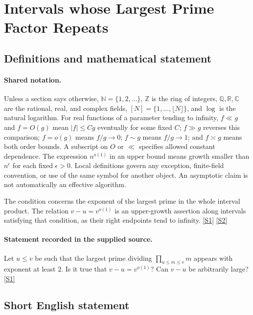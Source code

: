 \documentclass[11pt,a4paper]{article}
\newcommand{\N}{\mathbb{N}}
\newcommand{\Z}{\mathbb{Z}}
\newcommand{\Q}{\mathbb{Q}}
\newcommand{\R}{\mathbb{R}}
\newcommand{\C}{\mathbb{C}}
\newcommand{\sref}[2]{\hyperlink{source:#1:#2}{[S#2]}}
\begin{document}
\section{Intervals whose Largest Prime Factor Repeats}\label{statement}


\subsection{Definitions and mathematical statement}

\paragraph{Shared notation.}Unless a section says otherwise, $\N=\{1,2,\ldots\}$,
$\Z$ is the ring of integers, $\Q,\R,\C$ are the rational, real, and complex
fields, $[N]=\{1,\ldots,\lfloor N\rfloor\}$, and $\log$ is the natural
logarithm. For real functions of a parameter tending to infinity,
$f\ll g$ and $f=O(g)$ mean $|f|\leq Cg$ eventually for some fixed $C$;
$f\gg g$ reverses this comparison; $f=o(g)$ means $f/g\to0$;
$f\sim g$ means $f/g\to1$; and $f\asymp g$ means both order bounds.
A subscript on $O$ or $\ll$ specifies allowed constant dependence.
The expression $n^{o(1)}$ in an upper bound means growth smaller than
$n^\epsilon$ for each fixed $\epsilon>0$. Local definitions govern any
exception, finite-field convention, or use of the same symbol for another
object. An asymptotic claim is not automatically an effective algorithm.



The condition concerns the exponent of the largest prime in the whole interval product. The relation $v-u=v^{o(1)}$ is an upper-growth assertion along intervals satisfying that condition, as their right endpoints tend to infinity. \sref{statement}{1} \sref{statement}{2}

\paragraph{Statement recorded in the supplied source.}
Let $u\leq v$ be such that the largest prime dividing $\prod_{u\leq m\leq v}m$ appears with exponent at least $2$. Is it true that $v-u=v^{o(1)}$? Can $v-u$ be arbitrarily large? \sref{statement}{1}

\subsection{Short English statement}
\end{document}
